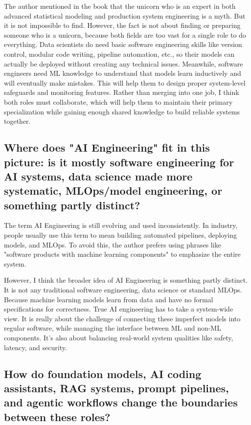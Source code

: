 \documentclass[11pt,a4paper]{article}
\begin{document}
The author mentioned in the book that the unicorn who is an expert in both advanced statistical modeling and production system engineering is a myth. But it is not impossible to find. However, the fact is not about finding or preparing someone who is a unicorn, because both fields are too vast for a single role to do everything. Data scientists do need basic software engineering skills like version control, modular code writing, pipeline automation, etc., so their models can actually be deployed without creating any technical issues. Meanwhile, software engineers need ML knowledge to understand that models learn inductively and will eventually make mistakes. This will help them to design proper system-level safeguards and monitoring features. Rather than merging into one job, I think both roles must collaborate, which will help them to maintain their primary specialization while gaining enough shared knowledge to build reliable systems together.

\subsection{Where does "AI Engineering" fit in this picture: is it mostly software engineering for AI systems, data science made more systematic, MLOps/model engineering, or something partly distinct?}

The term AI Engineering is still evolving and used inconsistently. In industry, people usually use this term to mean building automated pipelines, deploying models, and MLOps. To avoid this, the author prefers using phrases like "software products with machine learning components" to emphasize the entire system.

However, I think the broader idea of AI Engineering is something partly distinct. It is not any traditional software engineering, data science or standard MLOps. Because machine learning models learn from data and have no formal specifications for correctness. True AI engineering has to take a system-wide view. It is really about the challenge of connecting these imperfect models into regular software, while managing the interface between ML and non-ML components. It's also about balancing real-world system qualities like safety, latency, and security.

\subsection{How do foundation models, AI coding assistants, RAG systems, prompt pipelines, and agentic workflows change the boundaries between these roles?}
\end{document}
